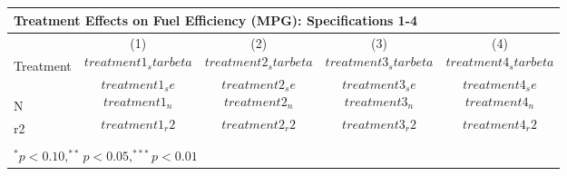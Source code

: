 \begin{tabular}{l*{4}{c}}
\multicolumn{5}{p{\linewidth}}{Treatment Effects on Fuel Efficiency (MPG): Specifications 1-4} \\
\hline\hline
                    &         (1)   &         (2)   &         (3)   &         (4)    \\
\hline
Treatment           &     $$treatment1_starbeta$$  &     \textbf{$$treatment2_starbeta$$}  &     $$treatment3_starbeta$$  &     \textbf{$$treatment4_starbeta$$}  \\
                    &     $$treatment1_se$$        &     \textbf{$$treatment2_se$$}        &     $$treatment3_se$$        &     \textbf{$$treatment4_se$$}        \\
N                   &      $$treatment1_n$$        &     $$treatment2_n$$                  &     $$treatment3_n$$         &      $$treatment4_n$$                 \\
r2                  &      $$treatment1_r2$$       &     $$treatment2_r2$$                 &     $$treatment3_r2$$        &      $$treatment4_r2$$                \\
\hline & & & & \\

\multicolumn{5}{p{\linewidth}}{$^{*}p<0.10, ^{**}p<0.05, ^{***}p<0.01$} \\
\end{tabular}
